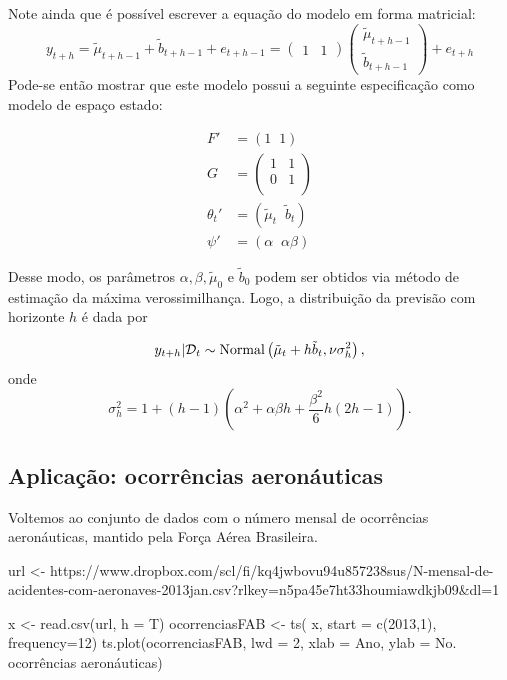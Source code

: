 \documentclass[
  letterpaper,
  DIV=11,
  numbers=noendperiod]{scrartcl}
\newenvironment{Shaded}{\begin{snugshade}}{\end{snugshade}}
\newcommand{\AttributeTok}[1]{\textcolor[rgb]{0.40,0.45,0.13}{#1}}
\newcommand{\DecValTok}[1]{\textcolor[rgb]{0.68,0.00,0.00}{#1}}
\newcommand{\FunctionTok}[1]{\textcolor[rgb]{0.28,0.35,0.67}{#1}}
\newcommand{\NormalTok}[1]{\textcolor[rgb]{0.00,0.23,0.31}{#1}}
\newcommand{\OtherTok}[1]{\textcolor[rgb]{0.00,0.23,0.31}{#1}}
\newcommand{\StringTok}[1]{\textcolor[rgb]{0.13,0.47,0.30}{#1}}
\theoremstyle{definition}
\theoremstyle{definition}
\theoremstyle{plain}
\theoremstyle{plain}
\theoremstyle{remark}
\begin{document}
Note ainda que é possível escrever a equação do modelo em forma
matricial:
\[y_{t+h}=\tilde{\mu}_{t+h-1}+\tilde{b}_{t+h-1}+e_{t+h-1}=(\begin{array}{cc}1&1\end{array})\left(\begin{array}{c}\tilde{\mu}_{t+h-1}\\ \tilde{b}_{t+h-1}\end{array}\right)+e_{t+h}\]
Pode-se então mostrar que este modelo possui a seguinte especificação
como modelo de espaço estado:

\begin{align}
F'&=(1\;\; 1)\\
G&=\left(\begin{array}{cc} 1 & 1 \\ 0 & 1\\ \end{array}\right)\\
\theta_t'&=(\tilde{\mu}_t\;\;\tilde{b}_t)\\
\psi'&=(\alpha\;\;\alpha\beta)
\end{align}

Desse modo, os parâmetros \(\alpha,\beta,\tilde{\mu}_0\) e
\(\tilde{b}_0\) podem ser obtidos via método de estimação da máxima
verossimilhança. Logo, a distribuição da previsão com horizonte \(h\) é
dada por

\[y_{t+h}|\mathcal{D}_t\sim\hbox{Normal}\left(\tilde{\mu}_t+h\tilde{b}_t, \nu\sigma^2_h\right),\]
onde
\[\sigma^2_h = 1+(h-1)\left(\alpha^2 + \alpha\beta h + \frac{\beta^2}{6}h(2h-1)\right).\]

\subsection{Aplicação: ocorrências
aeronáuticas}\label{aplicauxe7uxe3o-ocorruxeancias-aeronuxe1uticas}

Voltemos ao conjunto de dados com o número mensal de ocorrências
aeronáuticas, mantido pela Força Aérea Brasileira.

\begin{Shaded}
\begin{Highlighting}[]
\NormalTok{url }\OtherTok{\textless{}{-}} \StringTok{\textquotesingle{}https://www.dropbox.com/scl/fi/kq4jwbovu94u857238sus/N{-}mensal{-}de{-}acidentes{-}com{-}aeronaves{-}2013jan.csv?rlkey=n5pa45e7ht33houmiawdkjb09\&dl=1\textquotesingle{}}


\NormalTok{x }\OtherTok{\textless{}{-}} \FunctionTok{read.csv}\NormalTok{(url, }\AttributeTok{h =}\NormalTok{ T)}
\NormalTok{ocorrenciasFAB }\OtherTok{\textless{}{-}} \FunctionTok{ts}\NormalTok{( x, }\AttributeTok{start =} \FunctionTok{c}\NormalTok{(}\DecValTok{2013}\NormalTok{,}\DecValTok{1}\NormalTok{), }\AttributeTok{frequency=}\DecValTok{12}\NormalTok{)}
\FunctionTok{ts.plot}\NormalTok{(ocorrenciasFAB, }\AttributeTok{lwd =} \DecValTok{2}\NormalTok{, }\AttributeTok{xlab =} \StringTok{\textquotesingle{}Ano\textquotesingle{}}\NormalTok{, }\AttributeTok{ylab =} \StringTok{\textquotesingle{}No. ocorrências aeronáuticas\textquotesingle{}}\NormalTok{)}
\end{Highlighting}
\end{Shaded}
\end{document}
